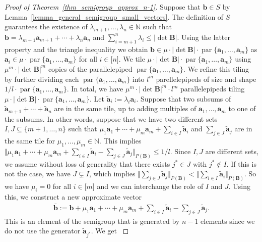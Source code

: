 \documentclass[pdflatex]{sn-jnl}
\DeclareMathOperator{\parr}{par}
\newcommand{\N}{\mathbb{N}}
\newcommand{\bb}{\bm{b}}
\newcommand{\ba}{\bm{a}}
\newcommand{\bB}{\bm{B}}
\theoremstyle{thmstyleone}%
\theoremstyle{thmstyletwo}%
\theoremstyle{thmstylethree}%
\begin{document}
	\begin{proof}[Proof of Theorem~\ref{thm_semigroup_approx_n-1}]
		Suppose that $\bb \in S$ by Lemma~\ref{lemma_general_semigroup_small_vectors}. The definition of $S$ guarantees the existence of $\lambda_{m+1},\ldots,\lambda_n\in \N$ such that $\bb = \lambda_{m+1}\ba_{m+1} + \cdots + \lambda_n\ba_n$ and $\sum_{i= m + 1}^n\lambda_{i}\leq \left|\det\bB\right|$. 
		Using the latter property and the triangle inequality we obtain $\bb \in \mu \cdot \left|\det\bB\right|\cdot\parr\lbrace \ba_1,\ldots,\ba_m\rbrace$ as $\ba_i \in \mu\cdot\parr\lbrace \ba_1,\ldots,\ba_m\rbrace$ for all $i\in\lbrack n\rbrack$.
		We tile $\mu \cdot \left|\det\bB\right|\cdot\parr\lbrace \ba_1,\ldots,\ba_m\rbrace$ using $\mu^m \cdot\left|\det\bB\right|^m$ copies of the parallelepiped $\parr\lbrace \ba_1,\ldots,\ba_m\rbrace$. 
		We refine this tiling by further dividing each $\parr\lbrace \ba_1,\ldots,\ba_m\rbrace$ into $l^m$ parellelepipeds of size and shape $1/l\cdot\parr\lbrace \ba_1,\ldots,\ba_m\rbrace$. In total, we have $\mu^m\cdot \left|\det\bB\right|^m \cdot l^m$ parallelepipeds tiling $\mu \cdot \left|\det\bB\right|\cdot\parr\lbrace \ba_1,\ldots,\ba_m\rbrace$. 
		Let $\tilde{\ba}_i := \lambda_i\ba_i$. Suppose that two subsums of $\tilde{\ba}_{m + 1} + \cdots + \tilde{\ba}_n$ are in the same tile, up to adding multiples of $\ba_1,\ldots,\ba_m$ to one of the subsums. In other words, suppose that we have two different sets $I,J\subseteq \lbrace m + 1,\ldots, n\rbrace$ such that $\mu_1\ba_1 + \cdots + \mu_m\ba_m + \sum_{i\in I}\tilde{\ba}_i$ and $\sum_{j\in J}\tilde{\ba}_j$ are in the same tile for $\mu_1,\ldots,\mu_m\in \N$. This implies $\Vert \mu_1\ba_1 + \cdots + \mu_m\ba_m + \sum_{i\in I}\tilde{\ba}_i - \sum_{j\in J}\tilde{\ba}_j\Vert_{P(\bB)}\leq 1/l$. Since $I,J$ are different sets, we assume without loss of generality that there exists $j^*\in J$ with $j^*\notin I$. If this is not the case, we have $J\subsetneq I$, which implies $\Vert\sum_{j\in J}\tilde{\ba}_j\Vert_{P(\bB)} < \Vert\sum_{i\in I}\tilde{\ba}_i$$\Vert_{P(\bB)}$. So we have $\mu_i = 0$ for all $i\in\lbrack m\rbrack$ and we can interchange the role of $I$ and $J$. 
		Using this, we construct a new approximate vector 
		\begin{align*}
			\bar{\bb} := \bb + \mu_1\ba_1 + \cdots + \mu_m\ba_m + \sum_{i\in I}\tilde{\ba}_i - \sum_{j\in J}\tilde{\ba}_j.
		\end{align*}
		This is an element of the semigroup that is generated by $n - 1$ elements since we do not use the generator $\tilde{\ba}_{j^*}$. We get  
$$
\end{proof}
\end{document}
